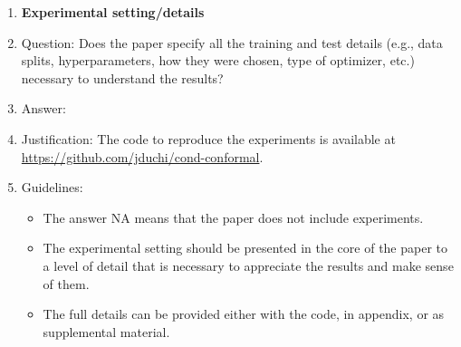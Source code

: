 \documentclass{article}
\begin{document}
\begin{enumerate}
\item {\bf Experimental setting/details}
    \item[] Question: Does the paper specify all the training and test details (e.g., data splits, hyperparameters, how they were chosen, type of optimizer, etc.) necessary to understand the results?
    \item[] Answer: \answerYes{} %
    \item[] Justification: The code to reproduce the experiments is
      available at \url{https://github.com/jduchi/cond-conformal}.
    \item[] Guidelines:
    \begin{itemize}
        \item The answer NA means that the paper does not include experiments.
        \item The experimental setting should be presented in the core of the paper to a level of detail that is necessary to appreciate the results and make sense of them.
        \item The full details can be provided either with the code, in appendix, or as supplemental material.
    \end{itemize}


\end{enumerate}
\end{document}
